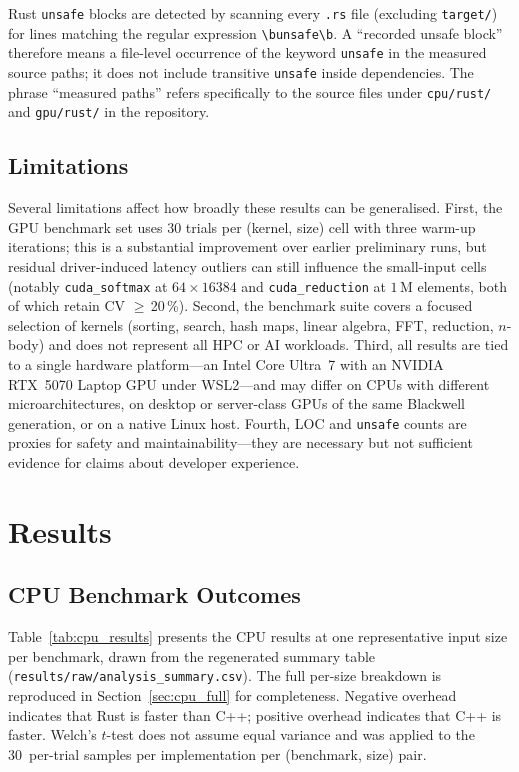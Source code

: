 \documentclass{article}
\begin{document}
Rust \texttt{unsafe} blocks are detected by scanning every
\texttt{.rs} file (excluding \texttt{target/}) for lines matching the
regular expression \verb|\bunsafe\b|.
A ``recorded unsafe block'' therefore means a file-level occurrence of
the keyword \texttt{unsafe} in the measured source paths; it does not
include transitive \texttt{unsafe} inside dependencies.
The phrase ``measured paths'' refers specifically to the source files
under \texttt{cpu/rust/} and \texttt{gpu/rust/} in the repository.

\subsection{Limitations}

Several limitations affect how broadly these results can be generalised.
First, the GPU benchmark set uses 30 trials per (kernel, size) cell with
three warm-up iterations; this is a substantial improvement over earlier
preliminary runs, but residual driver-induced latency outliers can still
influence the small-input cells (notably \texttt{cuda\_softmax} at
$64{\times}16384$ and \texttt{cuda\_reduction} at $1$\,M elements,
both of which retain CV $\geq$\,20\,\%).
Second, the benchmark suite covers a focused selection of kernels
(sorting, search, hash maps, linear algebra, FFT, reduction, $n$-body)
and does not represent all HPC or AI workloads.
Third, all results are tied to a single hardware platform---an Intel
Core Ultra~7 with an NVIDIA RTX~5070 Laptop GPU under WSL2---and may
differ on CPUs with different microarchitectures, on desktop or
server-class GPUs of the same Blackwell generation, or on a native
Linux host.
Fourth, LOC and \texttt{unsafe} counts are proxies for safety and
maintainability---they are necessary but not sufficient evidence for
claims about developer experience.

\section{Results}

\subsection{CPU Benchmark Outcomes}

Table~\ref{tab:cpu_results} presents the CPU results at one representative
input size per benchmark, drawn from the regenerated summary table
(\texttt{results/raw/analysis\_summary.csv}).
The full per-size breakdown is reproduced in
Section~\ref{sec:cpu_full} for completeness.
Negative overhead indicates that Rust is faster than C++;
positive overhead indicates that C++ is faster.
Welch's $t$-test does not assume equal variance and was applied to the
30~per-trial samples per implementation per (benchmark, size) pair.
\end{document}
